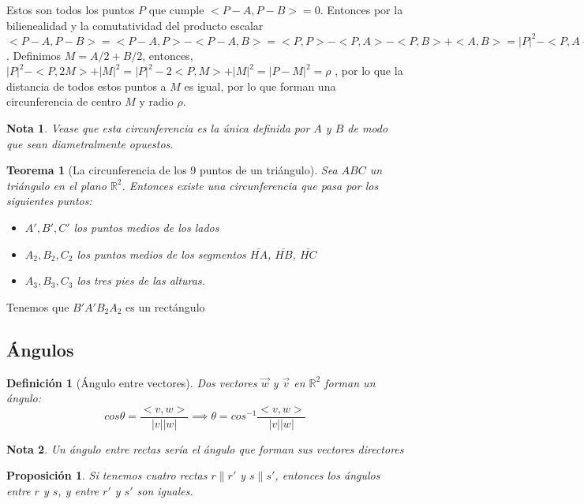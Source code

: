 \documentclass[11pt, a4paper, titlepage]{article}
\makeatletter
\renewenvironment{proof}[1][\proofname] {\vspace{-15pt}\par\pushQED{\qed}\normalfont\topsep6\p@\@plus6\p@\relax\trivlist\item[\hskip\labelsep\it#1\@addpunct{.}]\ignorespaces}{\popQED\endtrivlist\@endpefalse}
\newcommand{\R}{\mathbb{R}}
\renewcommand{\vec}{\overrightarrow}
\renewenvironment{proof}[1][\proofname] {\par\pushQED{\qed}\normalfont\topsep6\p@\@plus6\p@\relax\trivlist\item[\hskip\labelsep\itshape\sffamily#1\@addpunct{.}]\ignorespaces}{\popQED\endtrivlist\@endpefalse}
\theoremstyle{theorem-style}
\newtheorem{nth}{Teorema}[section]
\newtheorem{nprop}{Proposición}[section]
\theoremstyle{definition-style}
\newtheorem{ndef}{Definición}[section]
\theoremstyle{remark-style}
\newtheorem*{nota}{Nota}
\theoremstyle{example-style}
\makeatother
\begin{document}
\begin{proof}
	Estos son todos los puntos $P$ que cumple $<P-A, P-B>=0$. Entonces por la bilienealidad y la comutatividad del producto escalar $<P-A,P-B> = <P-A,P> - < P-A,B> = <P,P> - <P,A> - <P,B> + <A,B> = | P|^2 - <P,A+B> + <A,B> = 0  $. Definimos $M=A/2+B/2 $, entonces, %
	$|P|^2 - <P,2M> + |M|^2 = |P|^2 - 2<P,M> + |M|^2 = |P-M|^2 = \rho$ ,  por lo que la distancia de todos estos puntos a $M$ es igual, por lo que forman una circunferencia de centro $M$ y radio $\rho$. 
\end{proof}

\begin{nota}
	Vease que esta circunferencia es la única definida por $A$ y $B$ de modo que sean diametralmente opuestos.
\end{nota}

\begin{nth}[La circunferencia de los 9 puntos de un triángulo]
  Sea $ABC$ un triángulo en el plano $\R^2$. Entonces existe una circunferencia que pasa por los siguientes puntos:
  \begin{itemize}
  \item $A',B',C'$ los puntos medios de los lados
  \item $A_2,B_2,C_2$ los puntos medios de los segmentos $\bar{HA}$, $\bar{HB}$, $\bar{HC}$
  \item $A_3,B_3,C_3$ los tres pies de las alturas.
  \end{itemize}
\end{nth}
\begin{proof}
  Tenemos que $B'A'B_2A_2$ es un rectángulo
\end{proof}



\subsection{Ángulos}

\begin{ndef}[Ángulo entre vectores]
  Dos vectores $\vec{w}$ y $\vec{v}$ en $\R^2$ forman un ángulo:
  \[
    cos \theta =  \frac{< v,w >}{|v||w|} \implies \theta = cos^{-1} \frac{< v,w >}{|v||w|}
  \]
\end{ndef}
\begin{nota}
  Un ángulo entre rectas sería el ángulo que forman sus vectores directores
\end{nota}
\begin{nprop}
  Si tenemos cuatro rectas $r \parallel r'$ y $s \parallel s'$, entonces los ángulos entre $r$ y $s$, y entre $r'$ y $s'$ son iguales.
\end{nprop}
\end{document}
